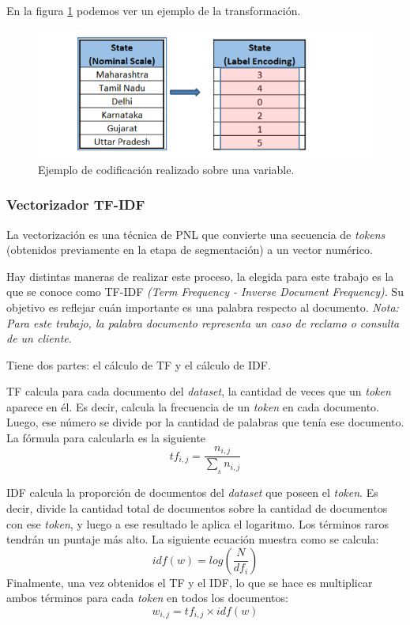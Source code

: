 En la figura \ref{fig:labelencoding} podemos ver un ejemplo de la transformación.

\begin{figure}[htbp]
	\centering
	\includegraphics[width=.8\textwidth]{./Figures/labelencoding.png}
	\caption{Ejemplo de codificación realizado sobre una variable\protect\footnotemark.}
	\label{fig:labelencoding}
\end{figure}


\subsubsection{Vectorizador TF-IDF}

La vectorización es una técnica de PNL que convierte una secuencia de \textit{tokens} (obtenidos previamente en la etapa de segmentación) a un vector numérico.

Hay distintas maneras de realizar este proceso, la elegida para este trabajo es la que se conoce como TF-IDF \textit{(Term Frequency - Inverse Document Frequency)}. Su objetivo es reflejar cuán importante es una palabra respecto al documento. \textit{Nota: Para este trabajo, la palabra documento representa un caso de reclamo o consulta de un cliente}. 

Tiene dos partes: el cálculo de TF y el cálculo de IDF.

TF calcula para cada documento del \textit{dataset}, la cantidad de veces que un \textit{token} aparece en él. Es decir, calcula la frecuencia de un \textit{token} en cada documento. Luego, ese número se divide por la cantidad de palabras que tenía ese documento. 
La fórmula para calcularla es la siguiente \citep{WEBSITE:17}
\begin{equation}
tf_{i,j}= \frac{n_{i,j}}{\sum_{_{k}}^{}n_{i,j}}
\end{equation}

IDF calcula la proporción de documentos del \textit{dataset} que poseen el \textit{token}. Es decir, divide la cantidad total de documentos sobre la cantidad de documentos con ese \textit{token}, y luego a ese resultado le aplica el logaritmo. Los términos raros tendrán un puntaje más alto. 
La siguiente ecuación muestra como se calcula:
\begin{equation}
idf(w) = log(\frac{N}{df_{i}})
\end{equation}
Finalmente, una vez obtenidos el TF y el IDF, lo que se hace es multiplicar ambos términos para cada \textit{token} en todos los documentos:
\begin{equation}
w_{i,j} = tf_{i,j} \times idf(w)
\end{equation}

